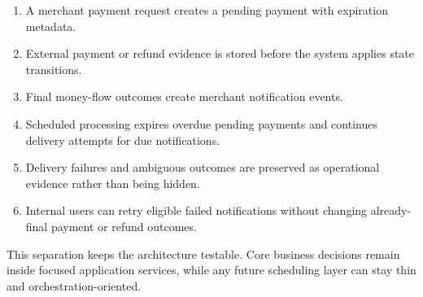 \begin{enumerate}
  \item A merchant payment request creates a pending payment with expiration
  metadata.
  \item External payment or refund evidence is stored before the system applies
  state transitions.
  \item Final money-flow outcomes create merchant notification events.
  \item Scheduled processing expires overdue pending payments and continues
  delivery attempts for due notifications.
  \item Delivery failures and ambiguous outcomes are preserved as operational
  evidence rather than being hidden.
  \item Internal users can retry eligible failed notifications without
  changing already-final payment or refund outcomes.
\end{enumerate}

This separation keeps the architecture testable. Core business decisions remain
inside focused application services, while any future scheduling layer can stay
thin and orchestration-oriented.
